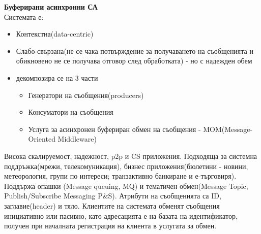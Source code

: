 \documentclass[11pt]{article} %
\begin{document}
\textbf{Буферирани асинхронни СА}\\
Системата е:
\begin{itemize}[noitemsep]
	\item Контекстна(data-centric)
	\item Слабо-свързана(не се чака потвърждение за получаването на съобщенията и обикновено не се получава отговор след обработката) - но с надежден обем
	\item декомпозира се на 3 части
	\begin{itemize}[noitemsep]
		\item Генератори на съобщения(producers)
		\item Консуматори на съобщения
		\item Услуга за асинхронен буфериран обмен на съобщения - MOM(Message-Oriented Middleware)
	\end{itemize}
\end{itemize}
Висока скалируемост, надежност, p2p и CS приложения. Подходяща за системна поддръжка(мрежи, телекомуникация), бизнес приложения(бюлетини - новини, метеорология, групи по интереси; транзактивно банкиране и е-търговиря). Поддържа опашки (Message queuing, MQ) и тематичен обмен(Message Topic, Publish/Subscribe Messaging P\&S). Атрибути на съобщенията са ID, заглавие(header) и тяло. Клиентите на системата обменят съобщения инициативно или пасивно, като адресацията е на базата на идентификатор, получен при началната регистрация на клиента в услугата за обмен.\\\par
\end{document}
